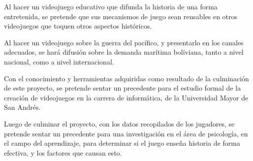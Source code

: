 Al hacer un videojuego educativo que difunda la historia de una forma entretenida, se pretende que sus mecanismos de juego sean reusables en otros videojuegos que toquen otros aspectos históricos. 

Al hacer un videojuego sobre la guerra del pacífico, y presentarlo en los canales adecuados, se hará difusión sobre la demanda marítima boliviana, tanto a nivel nacional, como a nivel internacional. 

Con el conocimiento y herramientas adquiridas como resultado de la culminación de este proyecto, se pretende sentar un precedente para el estudio formal de la creación de videojuegos en la carrera de informática, de la Universidad Mayor de San Andrés. 

Luego de culminar el proyecto, con los datos recopilados de los jugadores, se pretende sentar un precedente para una investigación en el área de psicología, en el campo del aprendizaje, para determinar si el juego enseña historia de forma efectiva, y los factores que causan esto.
